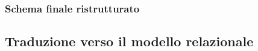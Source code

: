 \documentclass[11pt]{article}
\begin{document}
\subsubsection{Schema finale ristrutturato}
\begin{figure}[H]
    \centering
\end{figure}

\subsection{Traduzione verso il modello relazionale}
\end{document}
